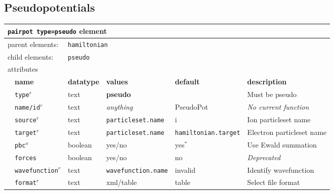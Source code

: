 \subsection{Pseudopotentials}

\FloatBarrier
\begin{table}[h]
\begin{center}
\begin{tabularx}{\textwidth}{l l l l l l }
\hline
\multicolumn{6}{l}{\texttt{pairpot type=pseudo} element} \\
\hline
\multicolumn{2}{l}{parent elements:} & \multicolumn{4}{l}{\texttt{hamiltonian}}\\
\multicolumn{2}{l}{child  elements:} & \multicolumn{4}{l}{\texttt{pseudo}}\\
\multicolumn{2}{l}{attributes}  & \multicolumn{4}{l}{}\\
   &   \bfseries name     & \bfseries datatype & \bfseries values & \bfseries default   & \bfseries description \\
   & \texttt{type}$^r$    &  text              & \textbf{pseudo} &                      & Must be pseudo         \\
   & \texttt{name/id}$^r$ &  text              & \textit{anything}&  PseudoPot          & \textit{No current function}\\
   & \texttt{source}$^r$  &  text              & \texttt{particleset.name} &  i                  & Ion particleset name\\
   & \texttt{target}$^r$  &  text              & \texttt{particleset.name} &\texttt{hamiltonian.target}& Electron particleset name  \\
   & \texttt{pbc}$^o$     &  boolean           & yes/no           & yes$^*$             & Use Ewald summation  \\
   & \texttt{forces}      &  boolean           & yes/no           & no                  & \textit{Deprecated}             \\
   &\texttt{wavefunction}$^r$ &  text          & \texttt{wavefunction.name}& invalid    & Identify wavefunction \\
   &   \texttt{format}$^r$    &  text          & xml/table        & table               & Select file format   \\
  \hline
\end{tabularx}
\end{center}
\end{table}
\FloatBarrier

